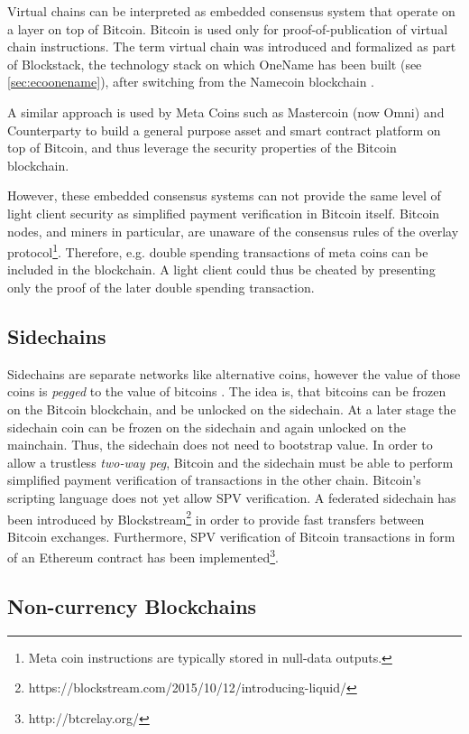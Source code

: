 Virtual chains can be interpreted as embedded consensus system that operate on a layer on top of Bitcoin. Bitcoin is used only for proof-of-publication of virtual chain instructions. The term virtual chain was introduced and formalized as part of Blockstack, the technology stack on which OneName has been built (see \ref{sec:ecoonename}), after switching from the Namecoin blockchain \parencite{ali2016blockstack}. 

A similar approach is used by Meta Coins such as Mastercoin (now Omni) and Counterparty to build a general purpose asset and smart contract platform on top of Bitcoin, and thus leverage the security properties of the Bitcoin blockchain. 

However, these embedded consensus systems can not provide the same level of light client security as simplified payment verification in Bitcoin itself. Bitcoin nodes, and miners in particular, are unaware of the consensus rules of the overlay protocol\footnote{Meta coin instructions are typically stored in null-data outputs.}. Therefore, e.g. double spending transactions of meta coins can be included in the blockchain. A light client could thus be cheated by presenting only the proof of the later double spending transaction.

\subsection{Sidechains}
Sidechains are separate networks like alternative coins, however the value of those coins is \emph{pegged} to the value of bitcoins \parencite{backenabling}. The idea is, that bitcoins can be frozen on the Bitcoin blockchain, and be unlocked on the sidechain. At a later stage the sidechain coin can be frozen on the sidechain and again unlocked on the mainchain. Thus, the sidechain does not need to bootstrap value.
In order to allow a trustless \emph{two-way peg}, Bitcoin and the sidechain must be able to perform simplified payment verification of transactions in the other chain. Bitcoin's scripting language does not yet allow SPV verification. A federated sidechain has been introduced by Blockstream\footnote{https://blockstream.com/2015/10/12/introducing-liquid/} in order to provide fast transfers between Bitcoin exchanges. Furthermore, SPV verification of Bitcoin transactions in form of an Ethereum contract has been implemented\footnote{http://btcrelay.org/}.

\subsection{Non-currency Blockchains}

